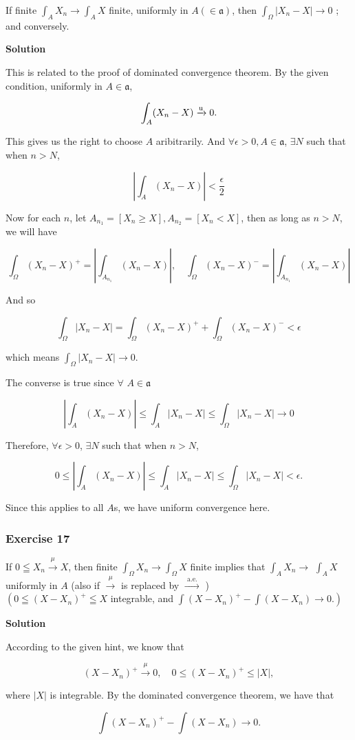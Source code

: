 \documentclass[
]{article}
\begin{document}
If finite \(\int_A X_n \rightarrow \int_A X\) finite, uniformly in
\(A(\in \mathfrak a)\), then
\(\int_{\Omega}\left|X_n-X\right| \rightarrow 0\) ; and conversely.

\textbf{Solution}

This is related to the proof of dominated convergence theorem. By the
given condition, uniformly in \(A\in \mathfrak a\),

\[\int_A (X_n - X) \xrightarrow{\text u } 0.\]

This gives us the right to choose \(A\) aribitrarily. And
\(\forall \epsilon > 0, A\in \mathfrak a\), \(\exists N\) such that when
\(n > N\),

\[\left|\int_A (X_n - X)\right| < \frac{\epsilon}{2}\]

Now for each \(n\), let \(A_{n_1} = [X_n \ge X], A_{n_2} = [X_n < X]\),
then as long as \(n > N\), we will have

\[\int_\Omega (X_n - X)^+ = \left|\int_{A_{n_1}} (X_n - X)\right|, \quad \int_\Omega (X_n - X)^- = \left|\int_{A_{n_1}} (X_n - X)\right|\]

And so

\[\int_\Omega |X_n - X| = \int_\Omega (X_n - X)^+ + \int_\Omega (X_n - X)^- < \epsilon\]

which means \(\int_{\Omega}\left|X_n-X\right| \rightarrow 0\).

The converse is true since \(\forall\) \(A \in \mathfrak a\)

\[\left|\int_A (X_n - X)\right| \le \int_A |X_n- X| \le \int_{\Omega} |X_n - X| \to 0\]

Therefore, \(\forall \epsilon > 0\), \(\exists N\) such that when
\(n > N\),

\[0 \le \left|\int_A (X_n - X)\right| \le \int_A |X_n- X| \le \int_{\Omega} |X_n - X| < \epsilon.\]

Since this applies to all \(A\)\textquotesingle s, we have uniform
convergence here.

\hypertarget{exercise-17}{%
  \subsubsection{Exercise 17}\label{exercise-17}}

If \(0 \leqq X_n \stackrel{\mu}{\rightarrow} X\), then finite
\(\int_{\Omega} X_n \rightarrow \int_{\Omega} X\) finite implies that
\(\int_A X_n \rightarrow\) \(\int_A X\) uniformly in \(A\) (also if
\(\stackrel{\mu}{\longrightarrow}\) is replaced by
\(\stackrel{\text { a.e. }}{\longrightarrow}\) )\\
\(\left(0 \leqq\left(X-X_n\right)^{+} \leqq X\right.\) integrable, and
\(\left.\int\left(X-X_n\right)^{+}-\int\left(X-X_n\right) \rightarrow 0.\right)\)

\textbf{Solution}

According to the given hint, we know that

\[(X - X_n)^+ \xrightarrow{\mu} 0, \quad 0 \le (X - X_n)^+ \le |X|,\]

where \(|X|\) is integrable. By the dominated convergence theorem, we
have that

\[\int\left(X-X_n\right)^{+}-\int\left(X-X_n\right) \rightarrow 0.\]
\end{document}

